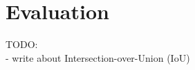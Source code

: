 \chapter{Evaluation} \label{chap:evaluation}
{
    \color{red}
    \noindent TODO: \\
    - write about Intersection-over-Union (IoU)
}